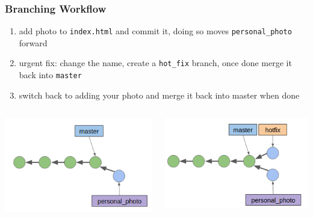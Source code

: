 \documentclass[12pt]{beamer}
\begin{document}
\begin{frame}
\frametitle{Branching Workflow}
\begin{enumerate}
	\item add photo to \texttt{index.html} and commit it, doing so moves \texttt{personal\_photo} forward
	\item urgent fix: change the name, create a \texttt{hot\_fix} branch, once done merge it back into \texttt{master}
	\item switch back to adding your photo and merge it back into master when done
\end{enumerate}
\begin{columns}
	\begin{column}{0.33\linewidth}
		\includegraphics[width=\linewidth]{branch_1}
	\end{column}
	\begin{column}{0.33\linewidth}
		\includegraphics[width=\linewidth]{branch_2}
	\end{column}

\end{columns}
\end{frame}
\end{document}
